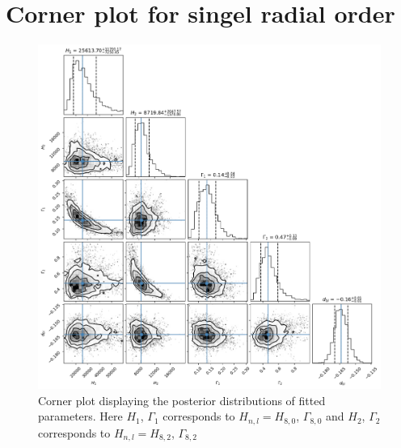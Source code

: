 \documentclass[12pt]{article}
\begin{document}
\section{Corner plot for singel radial order}\label{a:B}
\begin{figure}[H]
  \centering
  \includegraphics[width=\linewidth]{corner_lorentz1.png}
  \caption{Corner plot displaying the posterior distributions of fitted parameters. Here $H_1$, $\Gamma_1$ corresponds to $H_{n,l} = H_{8,0}$, $\Gamma_{8,0}$ and $H_2$, $\Gamma_2$ corresponds to $H_{n,l} = H_{8,2}$, $\Gamma_{8,2}$}
  \label{fig:corner_lorentz1}
\end{figure}
\newpage
\end{document}
